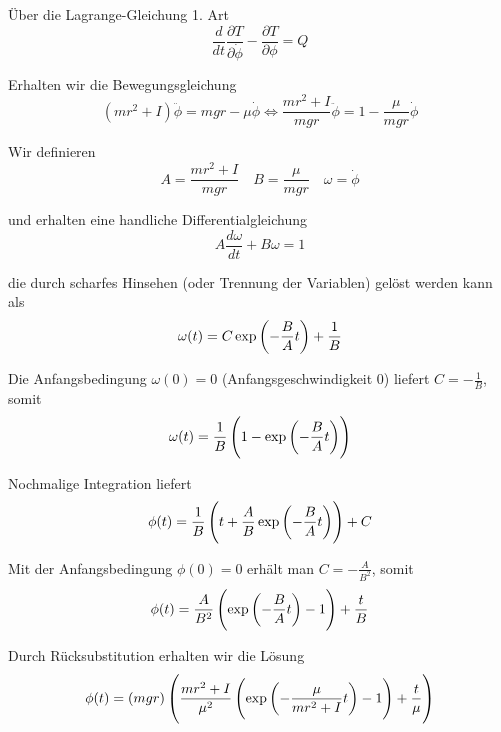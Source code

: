 \documentclass[a4paper,german,12pt,smallheadings]{scrartcl}
\begin{document}
Über die Lagrange-Gleichung 1. Art
\begin{equation}
  \frac{d}{dt} \frac{\partial T}{\partial \dot{\phi}} - \frac{\partial T}{\partial \phi} = Q
\end{equation}

Erhalten wir die Bewegungsgleichung
\begin{equation}
  (mr^2+I) \ddot{\phi} = mgr - \mu \dot{\phi} \Leftrightarrow
  \frac{mr^2+I}{mgr} \ddot{\phi} = 1 - \frac{\mu}{mgr} \dot{\phi}
\end{equation}

Wir definieren
\begin{equation*}
  A = \frac{mr^2+I}{mgr} \quad B = \frac{\mu}{mgr} \quad \omega = \dot{\phi}
\end{equation*}

und erhalten eine handliche Differentialgleichung
\begin{equation}
  A \frac{d \omega}{dt} + B \omega = 1
\end{equation}

die durch scharfes Hinsehen (oder Trennung der Variablen) gelöst werden kann als
\begin{equation}
  \omega(t) = C \exp\del{- \frac{B}{A} t} + \frac{1}{B}
\end{equation}

Die Anfangsbedingung $\omega(0) = 0$ (Anfangsgeschwindigkeit 0) liefert $C =
-\frac{1}{B}$, somit
\begin{equation}
  \omega(t) = \frac{1}{B} \del{1 - \exp\del{-\frac{B}{A} t}}
\end{equation}

Nochmalige Integration liefert
\begin{equation}
  \phi(t) = \frac{1}{B} \del{t + \frac{A}{B} \exp\del{-\frac{B}{A} t}} + C
\end{equation}

Mit der Anfangsbedingung $\phi(0) = 0$ erhält man $C = -\frac{A}{B^2}$, somit
\begin{equation}
  \phi(t) = \frac{A}{B^2} \del{ \exp\del{-\frac{B}{A} t} - 1} + \frac{t}{B}
\end{equation}

Durch Rücksubstitution erhalten wir die Lösung
\begin{equation}
  \phi(t)
  = \del{mgr}
  \del{
    \frac{mr^2+I}{\mu^2}
    \del{
      \exp\del{-\frac{\mu}{mr^2 + I} t} - 1
  } + \frac{t}{\mu}}
\end{equation}
\end{document}
